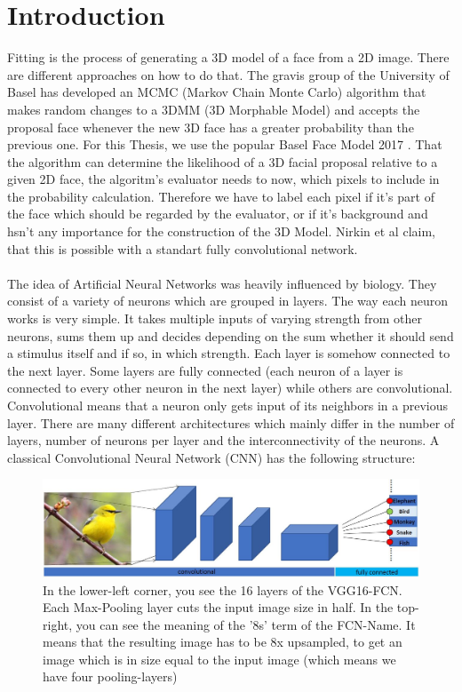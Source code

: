 \chapter{Introduction}
Fitting is the process of generating a 3D model of a face from a 2D image. There are different approaches on how to do that. The gravis group of the University of Basel has developed an MCMC (Markov Chain Monte Carlo) algorithm that makes random changes to a 3DMM (3D Morphable Model) and accepts the proposal face whenever the new 3D face has a greater probability than the previous one. For this Thesis, we use the popular Basel Face Model 2017 \cite{BFM2017}. That the algorithm can determine the likelihood of a 3D facial proposal relative to a given 2D face, the algoritm's evaluator needs to now, which pixels to include in the probability calculation. Therefore we have to label each pixel if it's part of the face which should be regarded by the evaluator, or if it's background and hsn't any importance for the construction of the 3D Model. Nirkin et al \cite{nirkin2018_faceswap} claim, that this is possible with a standart fully convolutional network.\\ 
\\
The idea of Artificial Neural Networks was heavily influenced by biology. They consist of a variety of neurons which are grouped in layers. The way each neuron works is very simple. It takes multiple inputs of varying strength from other neurons, sums them up and decides depending on the sum whether it should send a stimulus itself and if so, in which strength. Each layer is somehow connected to the next layer. Some layers are fully connected (each neuron of a layer is connected to every other neuron in the next layer) while others are convolutional. Convolutional means that a neuron only gets input of its neighbors in a previous layer. There are many different architectures which mainly differ in the number of layers, number of neurons per layer and the interconnectivity of the neurons. A classical Convolutional Neural Network (CNN) has the following structure:
\begin{figure}
	\centering
	\includegraphics[width=1\linewidth]{Figures/chap1/classicalCNN.JPG}
	\caption{In the lower-left corner, you see the 16 layers of the VGG16-FCN. Each Max-Pooling layer cuts the input image size in half. In the top-right, you can see the meaning of the '8s' term of the FCN-Name. It means that the resulting image has to be 8x upsampled, to get an image which is in size equal to the input image (which means we have four pooling-layers)}
	\label{fig:test1}
\end{figure}\\
